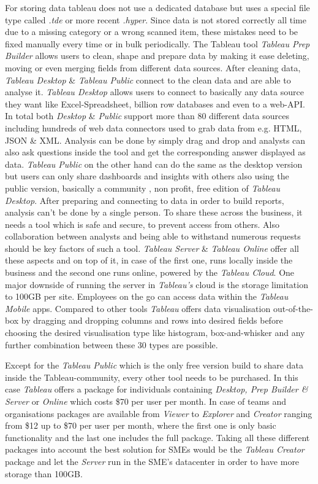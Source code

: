 \documentclass[../paper.tex]{subfiles}
\begin{document}
For storing data tableau does not use a dedicated database but uses a special file type called \textit{.tde} or more recent \textit{.hyper}. Since data is not stored correctly all time due to a missing category or a wrong scanned item, these mistakes need to be fixed manually every time or in bulk periodically. The Tableau tool \textit{Tableau Prep Builder} allows users to clean, shape and prepare data by making it ease deleting, moving or even merging fields from different data sources. After cleaning data, \textit{Tableau Desktop} \& \textit{Tableau Public} connect to the clean data and are able to analyse it. \textit{Tableau Desktop} allows users to connect to basically any data source they want like Excel-Spreadsheet, billion row databases and even to a web-API. In total both \textit{Desktop} \& \textit{Public} support more than 80 different data sources including hundreds of web data connectors used to grab data from e.g. HTML, JSON \& XML.  Analysis can be done by simply drag and drop and analysts can also ask questions inside the tool and get the corresponding answer displayed as data. \textit{Tableau Public} on the other hand can do the same as the desktop version but users can only share dashboards and insights with others also using the public version, basically a community , non profit, free edition of \textit{Tableau Desktop}. After preparing and connecting to data in order to build reports, analysis can't be done by a single person. To share these across the business, it needs a tool which is safe and secure, to prevent access from others. Also collaboration between analysts and being able to withstand numerous requests should be key factors of such a tool. \textit{Tableau Server} \& \textit{Tableau Online} offer all these aspects and on top of it, in case of the first one, runs locally inside the business and the second one runs online, powered by the \textit{Tableau Cloud}. One major downside of running the server in \textit{Tableau's} cloud is the storage limitation to 100GB per site. Employees on the go can access data within the \textit{Tableau Mobile} apps. Compared to other tools \textit{Tableau} offers data visualisation out-of-the-box by dragging and dropping columns and rows into desired fields before choosing the desired visualisation type like histogram, box-and-whisker and any further combination between these 30 types are possible.

Except for the \textit{Tableau Public} which is the only free version build to share data inside the Tableau-community, every other tool needs to be purchased. In this case \textit{Tableau} offers a package for individuals containing \textit{Desktop, Prep Builder \& Server} or \textit{Online} which costs \$70 per user per month. In case of teams and organisations packages are available from \textit{Viewer} to \textit{Explorer} and \textit{Creator} ranging from \$12 up to \$70 per user per month, where the first one is only basic functionality and the last one includes the full package. Taking all these different packages into account the best solution for SMEs would be the \textit{Tableau Creator} package and let the \textit{Server} run in the SME's datacenter in order to have more storage than 100GB.
\end{document}
